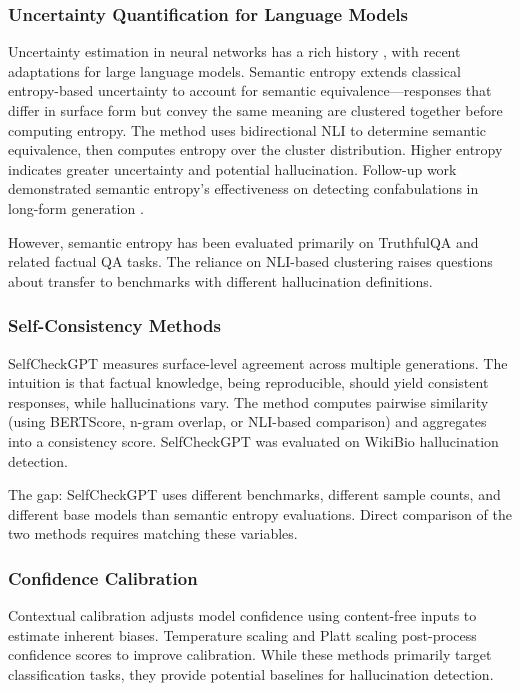 
\subsubsection{Uncertainty Quantification for Language Models}

Uncertainty estimation in neural networks has a rich history \citep{gal2016dropout}, with recent adaptations for large language models. Semantic entropy \citep{kuhn2023semantic} extends classical entropy-based uncertainty to account for semantic equivalence---responses that differ in surface form but convey the same meaning are clustered together before computing entropy. The method uses bidirectional NLI to determine semantic equivalence, then computes entropy over the cluster distribution. Higher entropy indicates greater uncertainty and potential hallucination. Follow-up work demonstrated semantic entropy's effectiveness on detecting confabulations in long-form generation \citep{farquhar2024detecting}.

However, semantic entropy has been evaluated primarily on TruthfulQA and related factual QA tasks. The reliance on NLI-based clustering raises questions about transfer to benchmarks with different hallucination definitions.

\subsubsection{Self-Consistency Methods}

SelfCheckGPT \citep{manakul2023selfcheckgpt} measures surface-level agreement across multiple generations. The intuition is that factual knowledge, being reproducible, should yield consistent responses, while hallucinations vary. The method computes pairwise similarity (using BERTScore, n-gram overlap, or NLI-based comparison) and aggregates into a consistency score. SelfCheckGPT was evaluated on WikiBio hallucination detection.

The gap: SelfCheckGPT uses different benchmarks, different sample counts, and different base models than semantic entropy evaluations. Direct comparison of the two methods requires matching these variables.

\subsubsection{Confidence Calibration}

Contextual calibration \citep{zhao2021calibrate} adjusts model confidence using content-free inputs to estimate inherent biases. Temperature scaling and Platt scaling \citep{guo2017calibration} post-process confidence scores to improve calibration. While these methods primarily target classification tasks, they provide potential baselines for hallucination detection.

